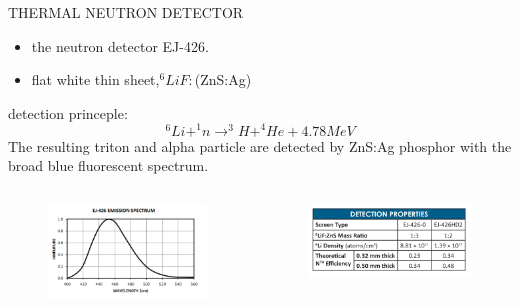 \documentclass[11pt,compress,xcolor=x11names,UTF8]{beamer}
\begin{document}
\begin{frame}{THERMAL NEUTRON DETECTOR}
\begin{itemize}
\item the neutron detector EJ-426.
\item flat white thin sheet,$^6{Li}F:$(ZnS:Ag)
\end{itemize}
detection princeple:
\begin{equation}
^6Li+^1n\rightarrow^3H+^4He+4.78MeV
\end{equation}
The resulting triton and alpha particle are detected by ZnS:Ag phosphor with the broad blue fluorescent spectrum.
\begin{columns}
\begin{column}{.5\textwidth}
\begin{figure}
\centering
\includegraphics[width=\textwidth]{currentfig/ej426spec.png} %
\end{figure}
\end{column}
\begin{column}{.5\textwidth}
\begin{figure}[!tbp]
\centering
\includegraphics[width=.99\textwidth]{currentfig/ej426formula.png} %
\end{figure}
\end{column}
\end{columns}
\end{frame}
\end{document}
